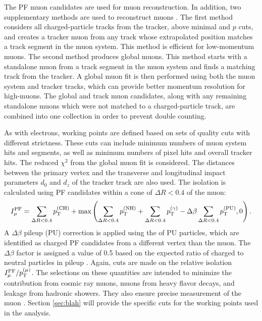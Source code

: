 The PF muon candidates are used for muon reconstruction. In addition, two supplementary methods are used to reconstruct muons \cite{CMS-PAS-MUO-10-002}. The first method considers all charged-particle tracks from the tracker, above minimal \pt and $p$ cuts, and creates a tracker muon from any track whose extrapolated position matches a track segment in the muon system. This method is efficient for low-momentum muons. The second method produces global muons. This method starts with a standalone muon from a track segment in the muon system and finds a matching track from the tracker. A global muon fit is then performed using both the muon system and tracker tracks, which can provide better momentum resolution for high-\pt muons. The global and track muon candidates, along with any remaining standalone muons which were not matched to a charged-particle track, are combined into one collection in order to prevent double counting.

As with electrons, working points are defined based on sets of quality cuts with different strictness. These cuts can include minimum numbers of muon system hits and segments, as well as minimum numbers of pixel hits and overall tracker hits. The reduced $\chi^2$ from the global muon fit is considered. The distances between the primary vertex and the transverse and longitudinal impact parameters $d_0$ and $d_z$ of the tracker track are also used. The isolation is calculated using PF candidates within a cone of $\Delta R < 0.4$ of the muon:
\begin{equation}
I^{\text{PF}}_{\mu} = \sum_{\Delta R < 0.4}{p_{\mathrm{T}}^{(\text{CH})}} + \text{max}\left( \sum_{\Delta R < 0.4}{p_{\mathrm{T}}^{(\text{NH})}} + \sum_{\Delta R < 0.4}{p_{\mathrm{T}}^{(\gamma)}} - \Delta\beta \sum_{\Delta R < 0.4}{p_{\mathrm{T}}^{(\text{PU})}}, 0 \right).
\end{equation}
A $\Delta\beta$ pileup (PU) correction is applied using the \pt of PU particles, which are identified as charged PF candidates from a different vertex than the muon. The $\Delta\beta$ factor is assigned a value of 0.5 based on the expected ratio of charged to neutral particles in pileup \cite{CMS-PAS-PFT-10-002}. Again, cuts are made on the relative isolation $I^{\text{PF}}_{\mu}/p_{\mathrm{T}}^{(\mu)}$. The selections on these quantities are intended to minimize the contribution from cosmic ray muons, muons from heavy flavor decays, and leakage from hadronic showers. They also ensure precise measurement of the muon \pt. Section \ref{sec:blah} will provide the specific cuts for the working points used in the analysis.

